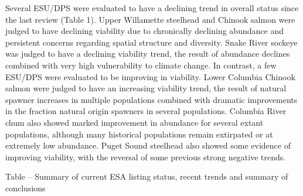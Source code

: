 \documentclass[
  letterpaper,
  oneside,
  open=any]{scrbook}
\begin{document}
Several ESU/DPS were evaluated to have a declining trend in overall
status since the last review (Table 1). Upper Willamette steelhead and
Chinook salmon were judged to have declining viability due to
chronically declining abundance and persistent concerns regarding
spatial structure and diversity. Snake River sockeye was judged to have
a declining viability trend, the result of abundance declines combined
with very high vulnerability to climate change. In contrast, a few
ESU/DPS were evaluated to be improving in viability. Lower Columbia
Chinook salmon were judged to have an increasing viability trend, the
result of natural spawner increases in multiple populations combined
with dramatic improvements in the fraction natural origin spawners in
several populations. Columbia River chum also showed marked improvement
in abundance for several extant populations, although many historical
populations remain extirpated or at extremely low abundance. Puget Sound
steelhead also showed some evidence of improving viability, with the
reversal of some previous strong negative trends.

Table -- Summary of current ESA listing status, recent trends and
summary of conclusions
\end{document}
